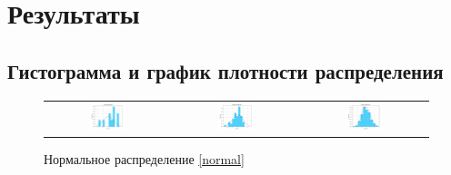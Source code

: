 \documentclass[a4paper,14pt]{article}
\begin{document}
	\section{Результаты}
	\subsection{Гистограмма и график плотности распределения}
	\begin{figure}[H]
		\centering
		\begin{tabular}{c c c}
			\includegraphics[height = 0.25\textheight, width = 0.31\textwidth]{../image/lab1/lab1_norm_10.png}
			& \includegraphics[height = 0.25\textheight, width = 0.31\textwidth]{../image/lab1/lab1_norm_50.png}
			& \includegraphics[height = 0.25\textheight, width = 0.31\textwidth]{../image/lab1/lab1_norm_1000.png}
		\end{tabular}
		\caption{Нормальное распределение \eqref{normal}}
		\label{fig:normal}
	\end{figure}
	
\end{document}
